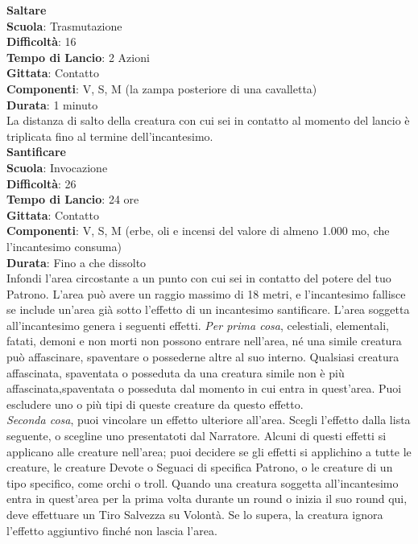 \begin{multicols}{2}
\medskip\textbf{Saltare}\\
\textbf{Scuola}: Trasmutazione\\
\textbf{Difficoltà}: 16\\
\textbf{Tempo di Lancio}: 2 Azioni\\
\textbf{Gittata}: Contatto\\
\textbf{Componenti}: V, S, M (la zampa posteriore di una cavalletta)\\
\textbf{Durata}: 1 minuto\\
La distanza di salto della creatura con cui sei in contatto al momento del lancio è triplicata fino al termine dell'incantesimo.\\

\medskip\textbf{Santificare}\\
\textbf{Scuola}: Invocazione\\
\textbf{Difficoltà}: 26\\
\textbf{Tempo di Lancio}: 24 ore\\
\textbf{Gittata}: Contatto\\
\textbf{Componenti}: V, S, M (erbe, oli e incensi del valore di almeno 1.000 mo, che l'incantesimo consuma)\\
\textbf{Durata}: Fino a che dissolto\\
Infondi l'area circostante a un punto con cui sei in contatto del potere del tuo Patrono. L'area può avere un raggio massimo di 18 metri, e l'incantesimo fallisce se include un'area già sotto l'effetto di un incantesimo santificare. L'area soggetta all'incantesimo genera i seguenti effetti.
\textit{Per prima cosa}, celestiali, elementali, fatati, demoni e non morti non possono entrare nell'area, né una simile creatura può affascinare, spaventare o possederne altre al suo interno. Qualsiasi creatura affascinata, spaventata o posseduta da una creatura simile non è più affascinata,spaventata o posseduta dal momento in cui entra in quest'area. Puoi escludere uno o più tipi di queste creature da questo effetto.\\
\textit{Seconda cosa}, puoi vincolare un effetto ulteriore all'area. Scegli l'effetto dalla lista seguente, o scegline uno presentatoti dal Narratore. Alcuni di questi effetti si applicano alle creature nell'area; puoi decidere se gli effetti si applichino a tutte le creature, le creature Devote o Seguaci di specifica Patrono, o le creature di un tipo specifico, come orchi o troll. Quando una creatura soggetta all'incantesimo entra in quest'area per la prima volta durante un round o inizia il suo round qui, deve effettuare un Tiro Salvezza su Volontà. Se lo supera, la creatura ignora l'effetto aggiuntivo finché non lascia l'area.\\

\end{multicols}

